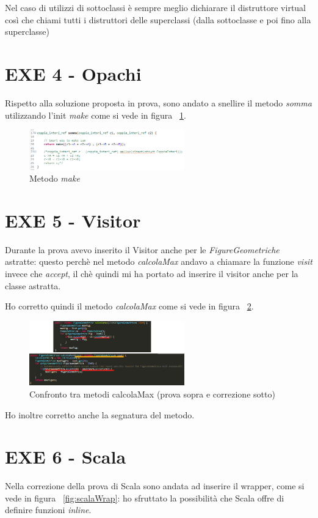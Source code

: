 Nel caso di utilizzi di sottoclassi è sempre meglio dichiarare il distruttore virtual così che chiami tutti i distruttori delle superclassi (dalla sottoclasse e poi fino alla superclasse)
\section{EXE 4 - Opachi}

Rispetto alla soluzione proposta in prova, sono andato a snellire il metodo \textit{somma} utilizzando l'init \textit{make} come si vede in figura ~\ref{fig:makeSomma}.

\begin{figure}[h]
	\centering
	\includegraphics[width=0.6\textwidth]{Immagini/makeSommaOpachi.png}
	\caption{Metodo \textit{make}}
	\label{fig:makeSomma}
\end{figure}

\section{EXE 5 - Visitor}
Durante la prova avevo inserito il Visitor anche per le \textit{FigureGeometriche} astratte: questo perchè nel metodo \textit{calcolaMax} andavo a chiamare la funzione \textit{visit} invece che \textit{accept}, il chè quindi mi ha portato ad inserire il visitor anche per la classe astratta.

Ho corretto quindi il metodo \textit{calcolaMax} come si vede in figura ~\ref{fig:calcolaMax}.

\begin{figure}[h]
	\centering
	\includegraphics[width=0.6\textwidth]{Immagini/calcolaMax.png}
	\caption{Confronto tra metodi calcolaMax (prova sopra e correzione sotto)}
	\label{fig:calcolaMax}
\end{figure}

Ho inoltre corretto anche la segnatura del metodo.
\section{EXE 6 - Scala}
Nella correzione della prova di Scala sono andata ad inserire il wrapper, come si vede in figura ~\ref{fig:scalaWrap}: ho sfruttato la possibilità che Scala offre di definire funzioni \textit{inline}.

